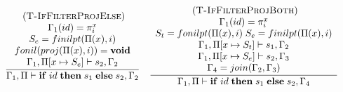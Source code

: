 \documentclass[preprint]{sigplanconf}
\newcommand{\Nil}{\mathbf{nil}}
\newcommand{\mylabel}[1]{\; (\textsc{#1})}
\newcommand{\env}{\Gamma}
\newcommand{\penv}{\Pi}
\newcommand{\subtype}{<:}
\begin{document}
\begin{figure*}[t]
{\[\begin{array}{c}
\begin{array}{c}
\end{array}
\begin{array}{c}
\mylabel{T-IfFilterProjElse}\\
\dfrac{\begin{array}{c}
	\env_{1}(id) = \pi_{i}^{x} \\
	 S_e = finilpt(\Pi(x), i)\\
	fonil(proj(\Pi(x), i)) = {\bf void} \\
	\env_{1}, \penv[x \mapsto S_e] \vdash s_{2}, \env_{2} 
	\end{array}}
{\env_{1}, \penv \vdash \mathbf{if} \; id \; \mathbf{then} \; s_{1} \; \mathbf{else} \; s_{2}, \env_{2}}
\end{array}
\begin{array}{c}
\mylabel{T-IfFilterProjBoth}\\
\dfrac{\begin{array}{c}
	\env_{1}(id) = \pi_{i}^{x} \\ S_t = fonilpt(\Pi(x), i) \; S_e = finilpt(\Pi(x), i)\\
	\env_{1}, \penv[x \mapsto S_t] \vdash s_{1}, \env_{2} \\
	\env_{1}, \penv[x \mapsto S_e] \vdash s_{2}, \env_{3} \\
	\env_{4} = join(\env_{2}, \env_{3}) 
	\end{array}}
{\env_{1}, \penv \vdash \mathbf{if} \; id \; \mathbf{then} \; s_{1} \; \mathbf{else} \; s_{2}, \env_{4}}
\end{array}\\\\

\end{array}\]}
\end{figure*}
\end{document}
